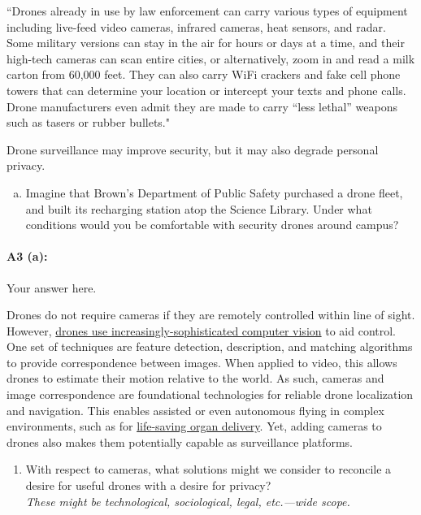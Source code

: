 ``Drones already in use by law enforcement can carry various types of equipment including live-feed video cameras, infrared cameras, heat sensors, and radar. Some military versions can stay in the air for hours or days at a time, and their high-tech cameras can scan entire cities, or alternatively, zoom in and read a milk carton from 60,000 feet. They can also carry WiFi crackers and fake cell phone towers that can determine your location or intercept your texts and phone calls. Drone manufacturers even admit they are made to carry “less lethal” weapons such as tasers or rubber bullets."

Drone surveillance may improve security, but it may also degrade personal privacy.

\begin{enumerate}[(a)]
    \item Imagine that Brown's Department of Public Safety purchased a drone fleet, and built its recharging station atop the Science Library. Under what conditions would you be comfortable with security drones around campus?
\end{enumerate}

\paragraph{A3 (a):} Your answer here.




\newpage
Drones do not require cameras if they are remotely controlled within line of sight. However, \href{https://link.springer.com/article/10.1007/s10846-017-0483-z}{drones use increasingly-sophisticated computer vision} to aid control. One set of techniques are feature detection, description, and matching algorithms to provide correspondence between images. When applied to video, this allows drones to estimate their motion relative to the world. As such, cameras and image correspondence are foundational technologies for reliable drone localization and navigation. This enables assisted or even autonomous flying in complex environments, such as for \href{https://www.cnn.com/2019/05/01/health/drone-organ-transplant-bn-trnd/index.html}{life-saving organ delivery}. Yet, adding cameras to drones also makes them potentially capable as surveillance platforms.


\begin{enumerate}[resume*]
    \item With respect to cameras, what solutions might we consider to reconcile a desire for useful drones with a desire for privacy? \\
    \emph{These might be technological, sociological, legal, etc.---wide scope.}
\end{enumerate}

